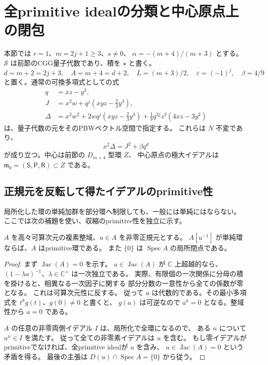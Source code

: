 \section{全primitive idealの分類と中心原点上の閉包}
\label{sec:primitive-spectrum-v36}

本節では $r=1$、$m=2j+1\ge3$、$s\ne0$、
$\alpha=-(m+4)/(m+3)$ とする。
$\mathcal S$ は前節のCGG量子代数であり、積を $\star$ と書く。
\[
 d=m+2=2j+3,\quad A=m+4=d+2,\quad L=(m+3)/2,
 \quad\varepsilon=(-1)^j,\quad\beta=4/9
\]
と置く。通常の可換多項式としての式
\begin{align*}
 q&=xz-y^2,\\
 J&=x^2w+q^j\left(xyz-\frac23y^3\right),\\
 \Delta&=x^2w^2+2wq^j\left(xyz-\frac23y^3\right)
       +\frac19q^{2j}z^2(4xz-3y^2)
\end{align*}
は、量子代数の元をそのPBWベクトル空間で指定する。
これらは $N$ 不変であり、
\[
 x^2\Delta=J^2+\beta q^d
\]
が成り立つ。中心は前節の $D_{m+4}$ 型環 $Z$、
中心原点の極大イデアルは
$\mathfrak m_0=(\mathsf S,\mathsf P,\mathsf R)\subset Z$ である。

\subsection{正規元を反転して得たイデアルのprimitive性}

局所化した環の単純加群を部分環へ制限しても、一般には単純にはならない。
ここでは次の補題を使い、収縮のprimitive性を独立に示す。

\begin{lemma}[単純な正規局所化からのprimitive性]
\label{lem:primitive-contraction-v36}
$A$ を高々可算次元の複素整域、$u\in A$ を非零正規元とする。
$A[u^{-1}]$ が単純環ならば、$A$ はprimitive環である。
また $\{0\}$ は $\operatorname{Spec}A$ の局所閉点である。
\end{lemma}

\begin{proof}
まず $\operatorname{Jac}(A)=0$ を示す。
$a\in\operatorname{Jac}(A)$ が $\mathbb C$ 上超越的なら、
$(1-\lambda a)^{-1}$、$\lambda\in\mathbb C^\times$ は一次独立である。
実際、有限個の一次関係に分母の積を掛けると、相異なる一次因子に関する
部分分数の一意性から全ての係数が零となる。
これは可算次元性に反する。
従って $a$ は代数的である。その最小多項式を $t^kg(t)$、$g(0)\ne0$ と書くと、
$g(a)$ は可逆なので $a^k=0$ となる。整域性から $a=0$ である。

$A$ の任意の非零両側イデアル $I$ は、局所化で全環になるので、
ある $n$ について $u^n\in I$ を満たす。
従って全ての非零素イデアルは $u$ を含む。
もし零イデアルがprimitiveでなければ、全primitive idealが $u$ を含み、
$u\in\operatorname{Jac}(A)=0$ という矛盾を得る。
最後の主張は $D(u)\cap\operatorname{Spec}A=\{0\}$ から従う。
\end{proof}

